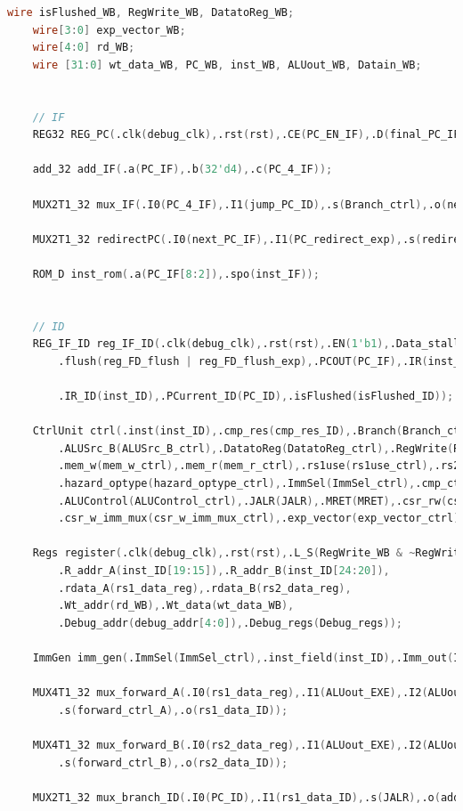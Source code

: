 \begin{lstlisting}[language = {verilog}]
    wire isFlushed_WB, RegWrite_WB, DatatoReg_WB;
    wire[3:0] exp_vector_WB;
    wire[4:0] rd_WB;
    wire [31:0] wt_data_WB, PC_WB, inst_WB, ALUout_WB, Datain_WB;


    // IF
    REG32 REG_PC(.clk(debug_clk),.rst(rst),.CE(PC_EN_IF),.D(final_PC_IF),.Q(PC_IF));
    
    add_32 add_IF(.a(PC_IF),.b(32'd4),.c(PC_4_IF));

    MUX2T1_32 mux_IF(.I0(PC_4_IF),.I1(jump_PC_ID),.s(Branch_ctrl),.o(next_PC_IF));

    MUX2T1_32 redirectPC(.I0(next_PC_IF),.I1(PC_redirect_exp),.s(redirect_mux_exp),.o(final_PC_IF));

    ROM_D inst_rom(.a(PC_IF[8:2]),.spo(inst_IF));


    // ID
    REG_IF_ID reg_IF_ID(.clk(debug_clk),.rst(rst),.EN(1'b1),.Data_stall(reg_FD_stall),
        .flush(reg_FD_flush | reg_FD_flush_exp),.PCOUT(PC_IF),.IR(inst_IF),

        .IR_ID(inst_ID),.PCurrent_ID(PC_ID),.isFlushed(isFlushed_ID));
    
    CtrlUnit ctrl(.inst(inst_ID),.cmp_res(cmp_res_ID),.Branch(Branch_ctrl),.ALUSrc_A(ALUSrc_A_ctrl),
        .ALUSrc_B(ALUSrc_B_ctrl),.DatatoReg(DatatoReg_ctrl),.RegWrite(RegWrite_ctrl),
        .mem_w(mem_w_ctrl),.mem_r(mem_r_ctrl),.rs1use(rs1use_ctrl),.rs2use(rs2use_ctrl),
        .hazard_optype(hazard_optype_ctrl),.ImmSel(ImmSel_ctrl),.cmp_ctrl(cmp_ctrl),
        .ALUControl(ALUControl_ctrl),.JALR(JALR),.MRET(MRET),.csr_rw(csr_rw_ctrl),
        .csr_w_imm_mux(csr_w_imm_mux_ctrl),.exp_vector(exp_vector_ctrl));
    
    Regs register(.clk(debug_clk),.rst(rst),.L_S(RegWrite_WB & ~RegWrite_cancel_exp),
        .R_addr_A(inst_ID[19:15]),.R_addr_B(inst_ID[24:20]),
        .rdata_A(rs1_data_reg),.rdata_B(rs2_data_reg),
        .Wt_addr(rd_WB),.Wt_data(wt_data_WB),
        .Debug_addr(debug_addr[4:0]),.Debug_regs(Debug_regs));
    
    ImmGen imm_gen(.ImmSel(ImmSel_ctrl),.inst_field(inst_ID),.Imm_out(Imm_out_ID));
    
    MUX4T1_32 mux_forward_A(.I0(rs1_data_reg),.I1(ALUout_EXE),.I2(ALUout_MEM),.I3(Datain_MEM),
        .s(forward_ctrl_A),.o(rs1_data_ID));
    
    MUX4T1_32 mux_forward_B(.I0(rs2_data_reg),.I1(ALUout_EXE),.I2(ALUout_MEM),.I3(Datain_MEM),
        .s(forward_ctrl_B),.o(rs2_data_ID));
    
    MUX2T1_32 mux_branch_ID(.I0(PC_ID),.I1(rs1_data_ID),.s(JALR),.o(addA_ID));


\end{lstlisting}
